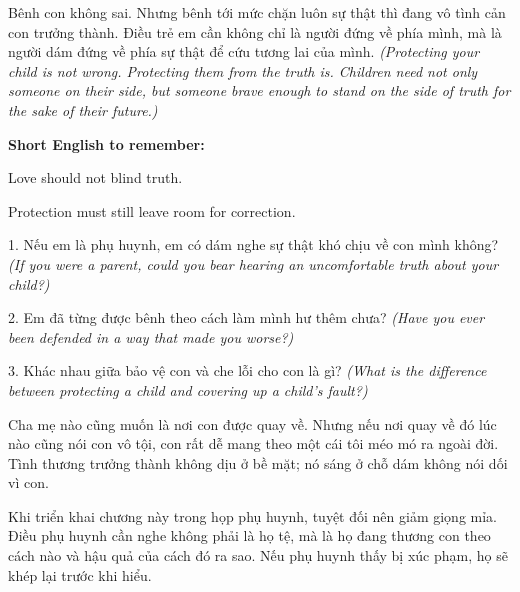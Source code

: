 \begin{baihoc}
Bênh con không sai. Nhưng bênh tới mức chặn luôn sự thật thì đang vô tình cản con trưởng thành. Điều trẻ em cần không chỉ là người đứng về phía mình, mà là người dám đứng về phía sự thật để cứu tương lai của mình.
\textit{(Protecting your child is not wrong. Protecting them from the truth is. Children need not only someone on their side, but someone brave enough to stand on the side of truth for the sake of their future.)}
\end{baihoc}

\begin{ghinhoanh}
\textbf{Short English to remember:}

Love should not blind truth.

Protection must still leave room for correction.
\end{ghinhoanh}

\begin{tuhocnhanh}
1. Nếu em là phụ huynh, em có dám nghe sự thật khó chịu về con mình không? \textit{(If you were a parent, could you bear hearing an uncomfortable truth about your child?)}

2. Em đã từng được bênh theo cách làm mình hư thêm chưa? \textit{(Have you ever been defended in a way that made you worse?)}

3. Khác nhau giữa bảo vệ con và che lỗi cho con là gì? \textit{(What is the difference between protecting a child and covering up a child's fault?)}
\end{tuhocnhanh}

\begin{tongketchuong}
Cha mẹ nào cũng muốn là nơi con được quay về. Nhưng nếu nơi quay về đó lúc nào cũng nói con vô tội, con rất dễ mang theo một cái tôi méo mó ra ngoài đời. Tình thương trưởng thành không dịu ở bề mặt; nó sáng ở chỗ dám không nói dối vì con.
\end{tongketchuong}

\begin{goigiaovien}
Khi triển khai chương này trong họp phụ huynh, tuyệt đối nên giảm giọng mỉa. Điều phụ huynh cần nghe không phải là họ tệ, mà là họ đang thương con theo cách nào và hậu quả của cách đó ra sao. Nếu phụ huynh thấy bị xúc phạm, họ sẽ khép lại trước khi hiểu.
\end{goigiaovien}

\ngancach